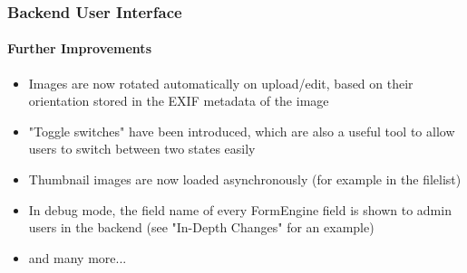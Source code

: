 \begin{frame}[fragile]
	\frametitle{Backend User Interface}
	\framesubtitle{Further Improvements}

	\begin{itemize}
		\item Images are now rotated automatically on upload/edit, based on
			their orientation stored in the EXIF metadata of the image
		\item "Toggle switches" have been introduced, which are also a useful
			tool to allow users to switch between two states easily
		\item Thumbnail images are now loaded asynchronously\newline
			\small(for example in the filelist)\normalsize
		\item In debug mode, the field name of every FormEngine field is shown
			to admin users in the backend\newline
			\small(see "In-Depth Changes" for an example)\normalsize
		\item and many more...
	\end{itemize}

\end{frame}

